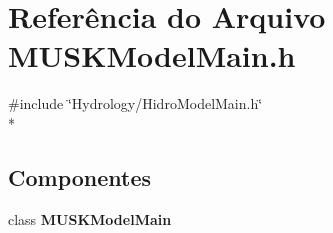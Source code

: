 \section{Referência do Arquivo M\+U\+S\+K\+Model\+Main.\+h}
\label{_m_u_s_k_model_main_8h}
{\ttfamily \#include \char`\"{}Hydrology/\+Hidro\+Model\+Main.\+h\char`\"{}}\\*
\subsection*{Componentes}
\begin{DoxyCompactItemize}
\item 
class {\bf M\+U\+S\+K\+Model\+Main}
\end{DoxyCompactItemize}

